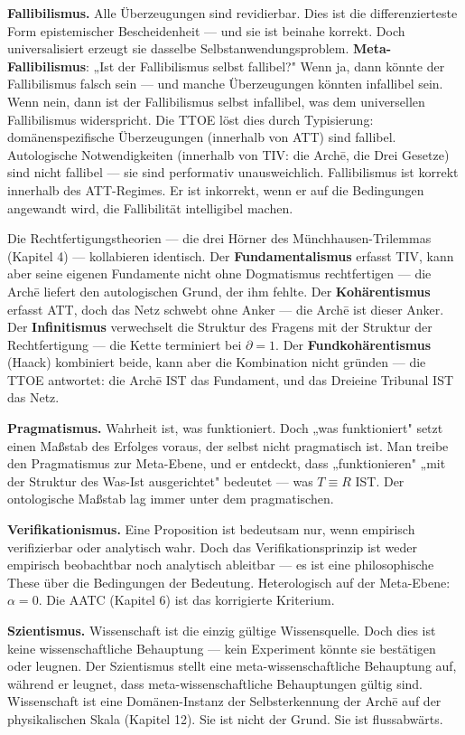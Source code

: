 \documentclass[10pt, openany, oneside]{book}
\begin{document}
\textbf{Fallibilismus.} Alle Überzeugungen sind revidierbar. Dies ist die differenzierteste Form epistemischer Bescheidenheit --- und sie ist beinahe korrekt. Doch universalisiert erzeugt sie dasselbe Selbstanwendungsproblem. \textbf{Meta-Fallibilismus}: „Ist der Fallibilismus selbst fallibel?" Wenn ja, dann könnte der Fallibilismus falsch sein --- und manche Überzeugungen könnten infallibel sein. Wenn nein, dann ist der Fallibilismus selbst infallibel, was dem universellen Fallibilismus widerspricht. Die TTOE löst dies durch Typisierung: domänenspezifische Überzeugungen (innerhalb von ATT) sind fallibel. Autologische Notwendigkeiten (innerhalb von TIV: die Arch\={e}, die Drei Gesetze) sind nicht fallibel --- sie sind performativ unausweichlich. Fallibilismus ist korrekt innerhalb des ATT-Regimes. Er ist inkorrekt, wenn er auf die Bedingungen angewandt wird, die Fallibilität intelligibel machen.

Die Rechtfertigungstheorien --- die drei Hörner des Münchhausen-Trilemmas (Kapitel 4) --- kollabieren identisch. Der \textbf{Fundamentalismus} erfasst TIV, kann aber seine eigenen Fundamente nicht ohne Dogmatismus rechtfertigen --- die Arch\={e} liefert den autologischen Grund, der ihm fehlte. Der \textbf{Kohärentismus} erfasst ATT, doch das Netz schwebt ohne Anker --- die Arch\={e} ist dieser Anker. Der \textbf{Infinitismus} verwechselt die Struktur des Fragens mit der Struktur der Rechtfertigung --- die Kette terminiert bei $\partial = 1$. Der \textbf{Fundkohärentismus} (Haack) kombiniert beide, kann aber die Kombination nicht gründen --- die TTOE antwortet: die Arch\={e} IST das Fundament, und das Dreieine Tribunal IST das Netz.

\textbf{Pragmatismus.} Wahrheit ist, was funktioniert. Doch „was funktioniert" setzt einen Maßstab des Erfolges voraus, der selbst nicht pragmatisch ist. Man treibe den Pragmatismus zur Meta-Ebene, und er entdeckt, dass „funktionieren" „mit der Struktur des Was-Ist ausgerichtet" bedeutet --- was $T \equiv R$ IST. Der ontologische Maßstab lag immer unter dem pragmatischen.

\textbf{Verifikationismus.} Eine Proposition ist bedeutsam nur, wenn empirisch verifizierbar oder analytisch wahr. Doch das Verifikationsprinzip ist weder empirisch beobachtbar noch analytisch ableitbar --- es ist eine philosophische These über die Bedingungen der Bedeutung. Heterologisch auf der Meta-Ebene: $\alpha = 0$. Die AATC (Kapitel 6) ist das korrigierte Kriterium.

\textbf{Szientismus.} Wissenschaft ist die einzig gültige Wissensquelle. Doch dies ist keine wissenschaftliche Behauptung --- kein Experiment könnte sie bestätigen oder leugnen. Der Szientismus stellt eine meta-wissenschaftliche Behauptung auf, während er leugnet, dass meta-wissenschaftliche Behauptungen gültig sind. Wissenschaft ist eine Domänen-Instanz der Selbsterkennung der Arch\={e} auf der physikalischen Skala (Kapitel 12). Sie ist nicht der Grund. Sie ist flussabwärts.
\end{document}
